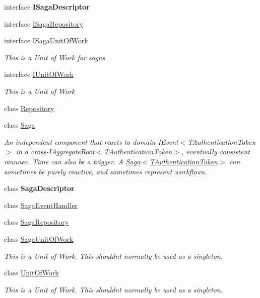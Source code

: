 \begin{DoxyCompactItemize}
interface {\bfseries I\+Saga\+Descriptor}
\item 
interface \hyperlink{interfaceCqrs_1_1Domain_1_1ISagaRepository}{I\+Saga\+Repository}
\item 
interface \hyperlink{interfaceCqrs_1_1Domain_1_1ISagaUnitOfWork}{I\+Saga\+Unit\+Of\+Work}
\begin{DoxyCompactList}\small\item\em This is a Unit of Work for sagas \end{DoxyCompactList}\item 
interface \hyperlink{interfaceCqrs_1_1Domain_1_1IUnitOfWork}{I\+Unit\+Of\+Work}
\begin{DoxyCompactList}\small\item\em This is a Unit of Work \end{DoxyCompactList}\item 
class \hyperlink{classCqrs_1_1Domain_1_1Repository}{Repository}
\item 
class \hyperlink{classCqrs_1_1Domain_1_1Saga}{Saga}
\begin{DoxyCompactList}\small\item\em An independent component that reacts to domain I\+Event$<$\+T\+Authentication\+Token$>$ in a cross-\/I\+Aggregate\+Root$<$\+T\+Authentication\+Token$>$, eventually consistent manner. Time can also be a trigger. A \hyperlink{classCqrs_1_1Domain_1_1Saga_a1b6019cecbbf2572b64dd456cb5d91a2}{Saga$<$\+T\+Authentication\+Token$>$} can sometimes be purely reactive, and sometimes represent workflows. \end{DoxyCompactList}\item 
class {\bfseries Saga\+Descriptor}
\item 
class \hyperlink{classCqrs_1_1Domain_1_1SagaEventHandler}{Saga\+Event\+Handler}
\item 
class \hyperlink{classCqrs_1_1Domain_1_1SagaRepository}{Saga\+Repository}
\item 
class \hyperlink{classCqrs_1_1Domain_1_1SagaUnitOfWork}{Saga\+Unit\+Of\+Work}
\begin{DoxyCompactList}\small\item\em This is a Unit of Work. This shouldn\textquotesingle{}t normally be used as a singleton. \end{DoxyCompactList}\item 
class \hyperlink{classCqrs_1_1Domain_1_1UnitOfWork}{Unit\+Of\+Work}
\begin{DoxyCompactList}\small\item\em This is a Unit of Work. This shouldn\textquotesingle{}t normally be used as a singleton. \end{DoxyCompactList}\end{DoxyCompactItemize}
